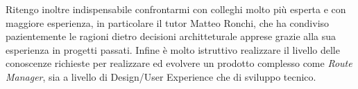 Ritengo inoltre indispensabile confrontarmi con colleghi molto più esperta e con maggiore esperienza, in particolare il tutor Matteo Ronchi, che ha condiviso pazientemente le ragioni dietro decisioni architteturale apprese grazie alla sua esperienza in progetti passati. 
Infine è molto istruttivo realizzare il livello delle conoscenze richieste per realizzare ed evolvere un prodotto complesso come \textit{Route Manager}, sia a livello di Design/User Experience che di sviluppo tecnico.
